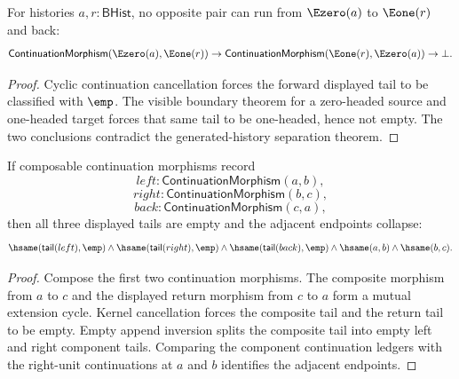 \begin{theorem}
\label{thm:continuation-morphism-e0-e1-cycle-absurd}
For histories $a,r:\mathsf{BHist}$, no opposite pair can run from
$\Ezero(a)$ to $\Eone(r)$ and back:
$$
\mathsf{ContinuationMorphism}(\Ezero(a),\Eone(r))
\to
\mathsf{ContinuationMorphism}(\Eone(r),\Ezero(a))
\to
\bot.
$$
\end{theorem}
\begin{proof}
Cyclic continuation cancellation forces the forward displayed tail to be
classified with $\emp$. The visible boundary theorem for a zero-headed source
and one-headed target forces that same tail to be one-headed, hence not empty.
The two conclusions contradict the generated-history separation theorem.
\end{proof}

\begin{theorem}
\label{thm:category-continuation-morphism-triangle-cycle-tails-empty}
If composable continuation morphisms record
$$
left:\mathsf{ContinuationMorphism}(a,b),
$$
$$
right:\mathsf{ContinuationMorphism}(b,c),
$$
$$
back:\mathsf{ContinuationMorphism}(c,a),
$$
then all three displayed tails are empty and the adjacent endpoints collapse:
$$
\hsame(\mathsf{tail}(left),\emp)\land
\hsame(\mathsf{tail}(right),\emp)\land
\hsame(\mathsf{tail}(back),\emp)\land
\hsame(a,b)\land\hsame(b,c).
$$
\end{theorem}
\begin{proof}
Compose the first two continuation morphisms. The composite morphism from $a$
to $c$ and the displayed return morphism from $c$ to $a$ form a mutual
extension cycle. Kernel cancellation forces the composite tail and the return
tail to be empty. Empty append inversion splits the composite tail into empty
left and right component tails. Comparing the component continuation ledgers
with the right-unit continuations at $a$ and $b$ identifies the adjacent
endpoints.
\end{proof}

